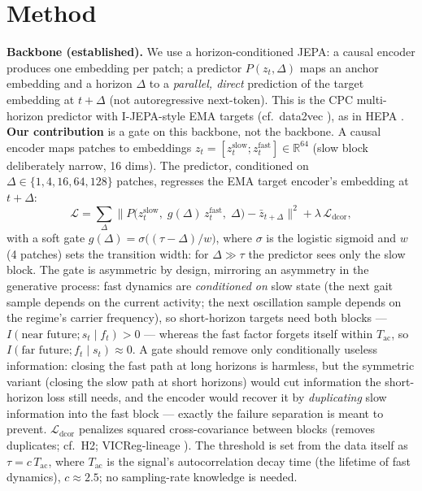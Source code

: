 \documentclass[10pt,twocolumn]{article}
\begin{document}
\section{Method}
\textbf{Backbone (established).} We use a horizon-conditioned JEPA: a causal
encoder produces one embedding per patch; a predictor $P(z_t,\Delta)$ maps an
anchor embedding and a horizon $\Delta$ to a \emph{parallel, direct} prediction
of the target embedding at $t+\Delta$ (not autoregressive next-token). This is
the CPC multi-horizon predictor \cite{oord2018representation} with I-JEPA-style
EMA targets \cite{assran2023self} (cf.\ data2vec \cite{baevski2022data2vec}),
as in HEPA \cite{hepa2026}. \textbf{Our contribution}
is a gate on this backbone, not the backbone.
A causal encoder maps patches to embeddings
$z_t=[z^{\mathrm{slow}}_t;z^{\mathrm{fast}}_t]\in\mathbb R^{64}$ (slow block
deliberately narrow, 16 dims). The predictor, conditioned on
$\Delta\in\{1,4,16,64,128\}$ patches, regresses the EMA target encoder's
embedding at $t+\Delta$:
\[
\mathcal L=\textstyle\sum_{\Delta}\big\|
P\big(z^{\mathrm{slow}}_t,\;g(\Delta)\,z^{\mathrm{fast}}_t,\;\Delta\big)
- \bar z_{t+\Delta}\big\|^2
+\lambda\,\mathcal L_{\mathrm{dcor}},
\]
with a soft gate $g(\Delta)=\sigma\!\big((\tau-\Delta)/w\big)$, where
$\sigma$ is the logistic sigmoid and $w$ (4 patches) sets the transition
width: for $\Delta\!\gg\!\tau$ the predictor sees only the slow block. The gate is
asymmetric by design, mirroring an asymmetry in the generative process: fast
dynamics are \emph{conditioned on} slow state (the next gait sample depends
on the current activity; the next oscillation sample depends on the regime's
carrier frequency), so short-horizon targets need both blocks ---
$I(\text{near future};s_t\mid f_t)>0$ --- whereas the fast factor forgets
itself within $T_{\mathrm{ac}}$, so $I(\text{far future};f_t\mid s_t)\approx
0$. A gate should remove only conditionally useless information: closing the
fast path at long horizons is harmless, but the symmetric variant (closing
the slow path at short horizons) would cut information the short-horizon
loss still needs, and the encoder would recover it by \emph{duplicating}
slow information into the fast block --- exactly the failure separation is
meant to prevent. $\mathcal L_{\mathrm{dcor}}$ penalizes squared cross-covariance
between blocks (removes duplicates; cf.\ H2; VICReg-lineage
\cite{bardes2022vicreg}). The threshold is set from the
data itself as $\tau = c\,T_{\mathrm{ac}}$, where $T_{\mathrm{ac}}$ is the
signal's autocorrelation decay time (the lifetime of fast dynamics), $c\!\approx\!2.5$;
no sampling-rate knowledge is needed.
\end{document}
